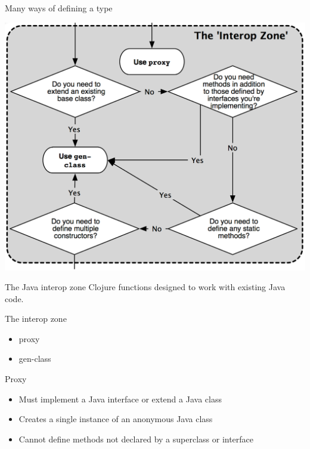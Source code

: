\documentclass[xcolor=dvipsnames]{beamer}
\begin{document}
		\begin{frame}{Many ways of defining a type}
		\begin{center}
			\includegraphics[scale=.15]{choosingtypeformszoom.png}
		\end{center}
		\end{frame}
		
		\begin{frame}{The Java interop zone}
			Clojure functions designed to work with existing Java code.
			\begin{block}{The interop zone}
			\begin{itemize}			
			\item proxy
			\item gen-class
			\end{itemize}
			\end{block}
		\end{frame}

	
	\begin{frame}{Proxy}
	\begin{itemize}
	\item Must implement a Java interface or extend a Java class
	\item Creates a single instance of an anonymous Java class
	\item Cannot define methods not declared by a superclass or interface
	\end{itemize}
	\end{frame}	

	
\end{document}
